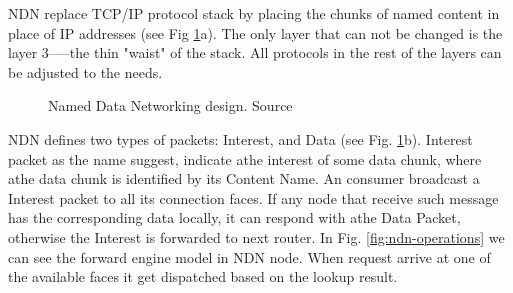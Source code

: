 NDN replace TCP/IP protocol stack by placing the chunks of named content in place of IP addresses (see Fig \ref{fig:ndn-design}a). The only layer that can not be changed is the layer 3–––the thin "waist" of the stack. All protocols in the rest of the layers can be adjusted to the needs.
\begin{figure}[h!]
 \hfill 	
\caption{Named Data Networking design. Source \cite{jacobson2009networking}}
\label{fig:ndn-design}
\end{figure}
NDN defines two types of packets: Interest, and Data (see Fig. \ref{fig:ndn-design}b). Interest packet as the name suggest, indicate athe interest of some data chunk, where athe data chunk is identified by its Content Name. An consumer broadcast a Interest packet to all its connection faces. If any node that receive such message has the corresponding data locally, it can respond with athe Data Packet, otherwise the Interest is forwarded to next router. In Fig. \ref{fig:ndn-operations} we can see the forward engine model in NDN node. When request arrive at one of the available faces it get dispatched based on the lookup result. 

